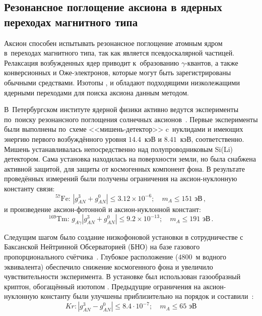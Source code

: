 \documentclass[a4paper,article,14pt]{extarticle}
\begin{document}
\subsection{Резонансное поглощение аксиона в ядерных переходах магнитного типа}
Аксион способен испытывать резонансное поглощение атомным ядром в~переходах магнитного типа, так как является псевдоскалярной частицей.
Релаксация возбужденных ядер приводит к~образованию $\gamma$-квантов, а также конверсионных и Оже-электронов, которые могут быть зарегистрированы обычными средствами.
Изотопы {\Fe}, {\Kr} и {\Tm} обладают подходящими низколежащими ядерными переходами для поиска аксиона данным методом.

В~Петербургском институте ядерной физики активно ведутся эксперименты по~поиску резонансного поглощения солнечных аксионов~\cite{Derbin2005,Derbin2007,Derbin2009,muratova2015searches,newlimits_tm}.
Первые эксперименты были выполнены по~схеме <<мишень-детектор>> c~нуклидами {\Fe} и {\Tm} имеющих энергию первого возбуждённого уровня $14.4$~кэВ и $8.41$~кэВ, соответственно.
Мишень устанавливалась непосредственно над полупроводниковым Si(Li) детектором.
Сама установка находилась на поверхности земли, но была снабжена активной защитой, для защиты от космогенных компонент фона.
В результате проведённых измерений были получены ограничения на аксион-нуклонную константу связи:
\begin{equation}
    ^{57}\text{Fe:\ }
    \left| {g_{AN}^3 + g_{AN}^0} \right| \leqslant
        3.12 \times 10^{-6};\quad m_A \leqslant 151 \text{\ эВ}\, ,
\end{equation}
и произведение аксион-фотонной и аксион-нуклонной констант:
\begin{equation}
    ^{169}\text{Tm:\ }
    g_{A\gamma} \left| {g_{AN}^3 + g_{AN}^0} \right| \leqslant
        9.2 \times {10^{ - 13}};\quad m_A \leqslant 191 \text{\ эВ}\, .
\end{equation}

Следущим шагом было создание низкофоновой установки в сотрудничестве с Баксанской Нейтринной Обсерваторией (БНО) на базе газового пропорционального счётчика~\cite{83Kr}.
Глубокое расположение ($4800$~м водного эквивалента) обеспечило снижение космогенного фона и увеличило чувствительности эксперимента.
В установке был использован газообразный криптон, обогащённый изотопом {\Kr}. Предыдущие ограничения на аксион-нуклонную константу были улучшены приблизительно на порядок и составили~\cite{Derbin_2017_Kr}:
\begin{equation}
    Kr:
    \left| {g_{AN}^3 - g_{AN}^0} \right| \leqslant
        8.4 \cdot {10^{ - 7}};\quad {m_A} \leqslant 65 \text{\ эВ}
\end{equation}
\end{document}
